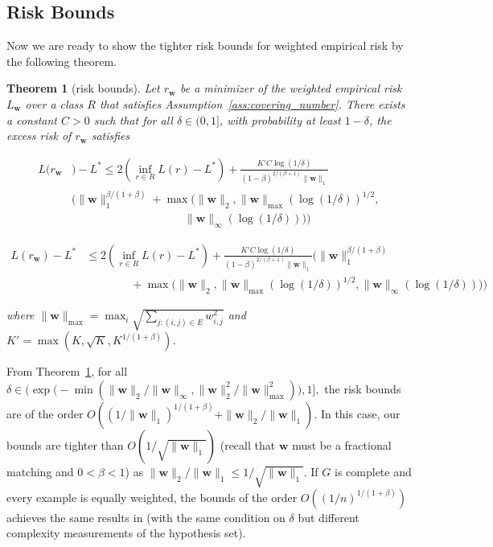 \documentclass[letterpaper]{article} %
\def\DoubleColumn{}
\def\DoubleColumnEnd{}
\def\SingleColumn{}
\def\SingleColumnEnd{}
\newtheorem{theorem}{Theorem}
\newcommand{\weight}{\mathbf{w}}
\newcommand{\bayeserror}{L^*}
\newcommand{\empiricalrisk}[1]{L_{#1}}
\newcommand{\risk}{L}
\newcommand{\pair}[1]{(#1)}
\newcommand{\normo}[1]{\|#1\|_1}
\newcommand{\complexbound}{\beta}
\begin{document}
\subsection{Risk Bounds} %
\label{sub:risk_bounds}
Now we are ready to show the tighter risk bounds for weighted empirical risk by the following theorem.
\begin{theorem}[risk bounds]
    \label{th:main_theorem}
    Let $r_\weight{}$ be a minimizer of the weighted empirical risk $\empiricalrisk{\weight{}}$ over a class $R$ that satisfies Assumption~\ref{ass:covering_number}. There exists a constant $C>0$ such that for all $\delta\in(0,1]$, with probability at least $1-\delta$, the excess risk of $r_\weight{}$ satisfies
    \DoubleColumn
    \begin{equation}
        \begin{aligned}
            \label{eq:main_result}
            \risk(r_\weight{}&)-\bayeserror \le 2(\inf_{r\in R}\risk(r)-\bayeserror) + \frac{K'C\log(1/\delta)}{(1-\complexbound)^{2/(\complexbound+1)}\normo{\weight{}}}\\
            &\Bigg(\normo{\weight{}}^{\complexbound/(1+\complexbound)}+\max\Big(\|\weight{}\|_2,\|\weight{}\|_{\max}(\log(1/\delta))^{1/2},\\
            &\qquad\qquad\qquad\qquad\qquad\|\weight{}\|_\infty(\log(1/\delta))\Big)\Bigg)
        \end{aligned}
    \end{equation}
    \DoubleColumnEnd
    \SingleColumn
    \begin{equation}
        \begin{aligned}
            \label{eq:main_result}
            \risk(r_\weight{})-\bayeserror &\le 2(\inf_{r\in R}\risk(r)-\bayeserror) + \frac{K'C\log(1/\delta)}{(1-\complexbound)^{2/(\complexbound+1)}\normo{\weight{}}}\Bigg(\normo{\weight{}}^{\complexbound/(1+\complexbound)}\\
            &\qquad\qquad+\max\Big(\|\weight{}\|_2,\|\weight{}\|_{\max}(\log(1/\delta))^{1/2},\|\weight{}\|_\infty(\log(1/\delta))\Big)\Bigg)
        \end{aligned}
    \end{equation}
    \SingleColumnEnd
    where $\|\weight{}\|_{\max}=\max_i \sqrt{\sum_{j:\pair{i,j}\in E} w_{i,j}^2}$ and $K'=\max(K,\sqrt{K},K^{1/(1+\complexbound{})})$.
\end{theorem}


From Theorem~\ref{th:main_theorem}, for all
$\delta\in\Bigg(\exp\Big(-\min(\|\weight{}\|_2/\|\weight{}\|_\infty,\|\weight{}\|_2^2/\|\weight{}\|_\max^2)\Big),1\Bigg],$ the risk bounds are of the order
$O\left((1/\normo{\weight{}})^{1/(1+\complexbound)}+\|\weight{}\|_2/\normo{\weight{}}\right).$ 
In this case, our bounds are tighter than $O(1/\sqrt{\normo{\weight{}}})$ (recall that $\weight{}$ must be a fractional matching and $0<\complexbound{}<1$)
as $\|\weight\|_2/\normo{\weight}\le 1/\sqrt{\normo{\weight}}$.
If $G$ is complete and every example is equally weighted, 
the bounds of the order $O((1/n)^{1/(1+\complexbound)})$ achieves the same results in \cite{papa2016graph} (with the same condition on $\delta$ but different complexity measurements of the hypothesis set).
\end{document}
